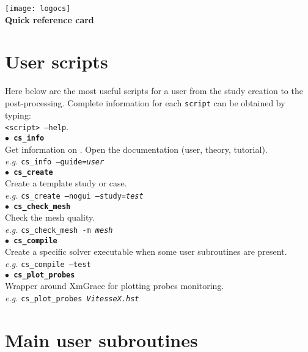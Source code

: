 \documentclass[a4paper,11pt]{article}
\newcommand{\refword}[1]{\texttt{$\bullet$ \bf{#1}}}
\begin{document}
\begin{multicols*}{3}

\begin{center}
  \texttt{[image: logocs]}
  {\Large {\bf \CS~\verscs\\Quick reference card}}
\end{center}


\section*{User scripts}

Here below are the most useful scripts for a \CS user from the study
creation to the post-processing. Complete information for each
\texttt{script} can be obtained by typing:\\
\texttt{<script> --help}.\\

\refword{cs\_info}\\
Get information on \CS. Open the documentation (user, theory,
tutorial).\\
\textit{e.g.} \texttt{cs\_info --guide=\emph{user}}\\

\refword{cs\_create}\\
Create a \CS template study or case.\\
\textit{e.g.} \texttt{cs\_create --nogui --study=\emph{test}}\\

\refword{cs\_check\_mesh}\\
Check the mesh quality.\\
\textit{e.g.} \texttt{cs\_check\_mesh -m \emph{mesh}}\\

\refword{cs\_compile}\\
Create a specific solver executable when some user subroutines are
present.\\
\textit{e.g.} \texttt{cs\_compile --test}\\

\refword{cs\_plot\_probes}\\
Wrapper around XmGrace for plotting probes monitoring.\\
\textit{e.g.} \texttt{cs\_plot\_probes \emph{VitesseX.hst}}


\section*{Main user subroutines}


\end{multicols*}
\end{document}
